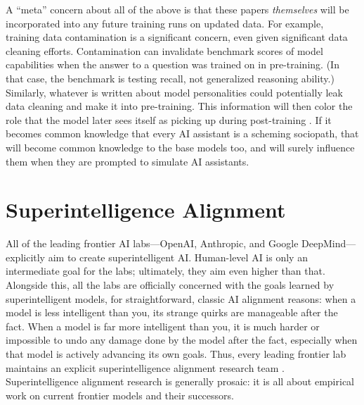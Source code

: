 A ``meta'' concern about all of the above is that these papers
\emph{themselves} will be incorporated into any future training runs on updated
data. For example, training data contamination is a significant concern, even
given significant data cleaning efforts. Contamination can invalidate benchmark
scores of model capabilities when the answer to a question was trained on in
pre-training. (In that case, the benchmark is testing recall, not generalized
reasoning ability.) Similarly, whatever is written about model personalities
could potentially leak data cleaning and make it into pre-training. This
information will then color the role that the model later sees itself as
picking up during post-training \cite{nostalgebraist2025void}. If it becomes
common knowledge that every AI assistant is a scheming sociopath, that will
become common knowledge to the base models too, and will surely influence them
when they are prompted to simulate AI assistants.

\section{Superintelligence Alignment}
All of the leading frontier AI labs---OpenAI, Anthropic, and Google
DeepMind---explicitly aim to create superintelligent AI. Human-level AI is only
an intermediate goal for the labs; ultimately, they aim even higher than that.
Alongside this, all the labs are officially concerned with the goals learned by
superintelligent models, for straightforward, classic AI alignment reasons:
when a model is less intelligent than you, its strange quirks are manageable
after the fact. When a model is far more intelligent than you, it is much
harder or impossible to undo any damage done by the model after the fact,
especially when that model is actively advancing its own goals. Thus, every
leading frontier lab maintains an explicit superintelligence alignment research
team \cite{leike2023superalignment, anthropic2025rsp}. Superintelligence
alignment research is generally prosaic: it is all about empirical work on
current frontier models and their successors.

